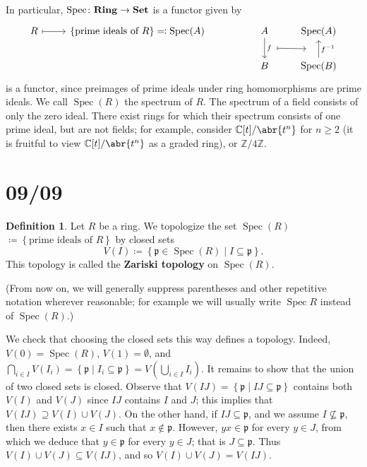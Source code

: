 \documentclass[11pt,leqno]{article}
\theoremstyle{plain}
\theoremstyle{definition}
\newtheorem{definition/}[lem]{Definition}
\newenvironment{definition}
  {\renewcommand{\qedsymbol}{\textdagger}%
   \pushQED{\qed}\begin{definition/}}
  {\popQED\end{definition/}}
\numberwithin{equation}{section}
\numberwithin{lem}{section}
\newcommand{\cbr}[1]{\left\{#1\right\}}
\newcommand{\bidx}[1]{\textbf{#1\index{#1}}} %
\DeclareMathOperator{\Spec}{Spec}
\newcommand{\catname}[1]{{\normalfont\mathbf{#1}}}
\newcommand{\Set}{\catname{Set}}
\newcommand{\Ring}{\catname{Ring}}
\begin{document}
In particular, $\Spec\colon \Ring\to \Set$ is a functor given by
\begin{equation}
  \begin{tikzcd}[ampersand replacement=\&]
    R \& {\cbr{\text{prime ideals of }R}\eqqcolon \Spec(A)} \&\& A \& {\Spec(A)} \\
    \&\&\& B \& {\Spec(B)}
    \arrow[maps to, from=1-1, to=1-2]
    \arrow[""{name=0, anchor=center, inner sep=0}, "f", from=1-4, to=2-4]
    \arrow[""{name=1, anchor=center, inner sep=0}, "{f^{-1}}"', from=2-5, to=1-5]
    \arrow[shorten <=12pt, shorten >=12pt, maps to, from=0, to=1]
  \end{tikzcd}
\end{equation}
is a functor, since preimages of prime ideals under ring homomorphisms are prime ideals. We call $\Spec(R)$ the spectrum of $R$. The spectrum of a field consists of only the zero ideal. There exist rings for which their spectrum consists of one prime ideal, but are not fields; for example, consider $\mathbb C[t]/\abr{t^n}$ for $n\geq 2$ (it is fruitful to view $\mathbb C[t]/\abr{t^n}$ as a graded ring), or $\mathbb Z/4\mathbb Z$.
\newpage\section{09/09}
\begin{definition}
  Let $R$ be a ring. We topologize the set \bidx{$\Spec(R)$}$\coloneqq \cbr{\text{prime ideals of }R}$ by closed sets 
  \begin{equation}
    V(I)\coloneqq \cbr{\mathfrak p\in \Spec(R)\mid I\subseteq \mathfrak p}.
  \end{equation} 
  This topology is called the \bidx{Zariski topology} on $\Spec(R)$.
\end{definition}
(From now on, we will generally suppress parentheses and other repetitive notation wherever reasonable; for example we will usually write $\Spec R$ instead of $\Spec(R)$.)

We check that choosing the closed sets this way defines a topology. Indeed, $V(0) = \Spec(R)$, $V(1) = \emptyset$, and $\bigcap_{i\in I}V(I_i) = \cbr{\mathfrak p \mid I_i\subseteq \mathfrak p} = V(\bigcup_{i\in I}I_i)$. It remains to show that the union of two closed sets is closed. Observe that $V(IJ) = \cbr{\mathfrak p\mid IJ\subseteq \mathfrak p}$ contains both $V(I)$ and $V(J)$ since $IJ$ contains $I$ and $J$; this implies that $V(IJ)\supseteq V(I)\cup V(J)$. On the other hand, if $IJ\subseteq\mathfrak p$, and we assume $I\not\subseteq \mathfrak p$, then there exists $x\in I$ such that $x\not\in\mathfrak p$. However, $yx\in \mathfrak p$ for every $y\in J$, from which we deduce that $y\in\mathfrak p$ for every $y\in J$; that is $J\subseteq \mathfrak p$. Thus $V(I)\cup V(J)\subseteq V(IJ)$, and so $V(I)\cup V(J)= V(IJ)$.
\end{document}
